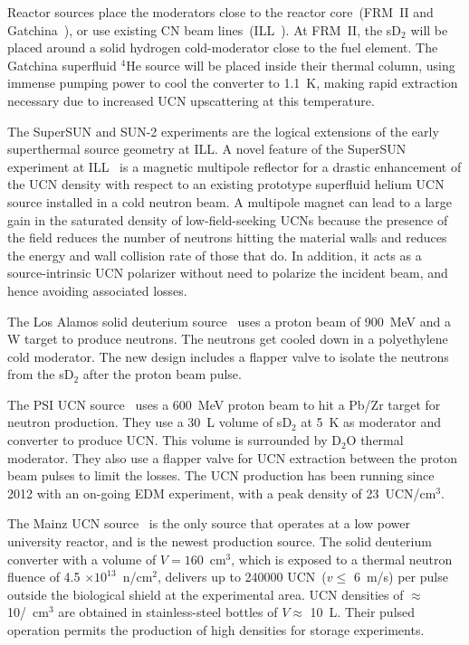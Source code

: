 Reactor sources place the moderators close to the reactor core~(FRM~II
and Gatchina~\cite{Serebrov_ascona}), or use existing CN beam
lines~(ILL~\cite{Piegsa2014}). At FRM~II, the sD$_2$ will be placed
around a solid hydrogen cold-moderator close to the fuel element. The
Gatchina superfluid $^4$He source will be placed inside their thermal
column, using immense pumping power to cool the converter to 1.1~K,
making rapid extraction necessary due to increased UCN upscattering at
this temperature.

The SuperSUN and SUN-2 experiments are the logical extensions of the
early superthermal source geometry at ILL.  A novel feature of the
SuperSUN experiment at ILL~\cite{Zimmer2015} is a magnetic multipole
reflector for a drastic enhancement of the UCN density with respect to
an existing prototype superfluid helium UCN source installed in a cold
neutron beam. A multipole magnet can lead to a large gain in the
saturated density of low-field-seeking UCNs because the presence of
the field reduces the number of neutrons hitting the material walls
and reduces the energy and wall collision rate of those that do. In
addition, it acts as a source-intrinsic UCN polarizer without need to
polarize the incident beam, and hence avoiding associated losses.

The Los Alamos solid deuterium source~\cite{Ito_ascona} uses a
proton beam of 900~MeV and a W target to produce neutrons. The
neutrons get cooled down in a polyethylene cold moderator. The new
design includes a flapper valve to isolate the neutrons from the
sD$_2$ after the proton beam pulse.

The PSI UCN source~\cite{Ries_ascona} uses a 600~MeV proton beam
to hit a Pb/Zr target for neutron production. They use a 30~L volume
of sD$_2$ at 5~K as moderator and converter to produce UCN. This
volume is surrounded by D$_2$O thermal moderator. They also use a
flapper valve for UCN extraction between the proton beam pulses to
limit the losses. The UCN production has been running since 2012 with
an on-going EDM experiment, with a peak density of 23~UCN/cm$^3$.

The Mainz UCN source~\cite{Karch2014} is the only source that
operates at a low power university reactor, and is the newest
production source. The solid deuterium converter with a volume of $V =
160$~cm$^3$, which is exposed to a thermal neutron fluence of 4.5
$\times 10^{13}$~n/cm$^2$, delivers up to 240000 UCN~($v \leq$ 6~m/s)
per pulse outside the biological shield at the experimental area.  UCN
densities of $\approx$ 10/~cm$^3$ are obtained in stainless-steel
bottles of $V \approx$ 10~L. Their pulsed operation permits the
production of high densities for storage experiments.


